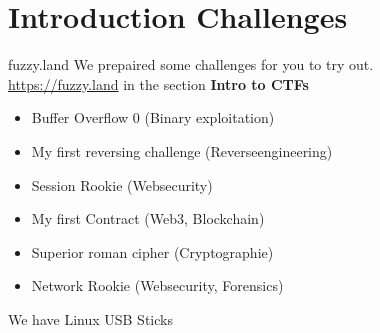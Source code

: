 \documentclass[12pt]{beamer}
\begin{document}
\section{Introduction Challenges}
\begin{frame}{fuzzy.land}
    We prepaired some challenges for you to try out. \\
    \url{https://fuzzy.land} in the section {\bf Intro to CTFs}
    \begin{itemize}
        \item Buffer Overflow 0 (Binary exploitation)
        \item My first reversing challenge (Reverseengineering)
        \item Session Rookie (Websecurity)
        \item My first Contract (Web3, Blockchain)
        \item Superior roman cipher (Cryptographie)
        \item Network Rookie (Websecurity, Forensics)
    \end{itemize}
    We have Linux USB Sticks

\end{frame}
\end{document}
